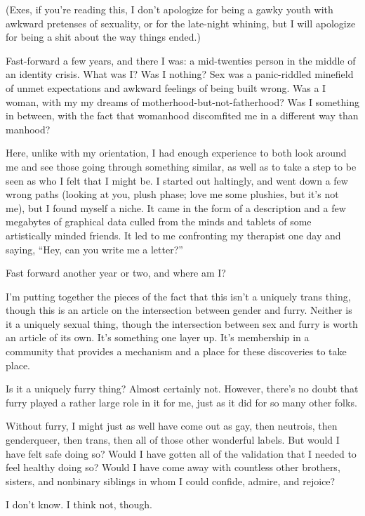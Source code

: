 (Exes, if you're reading this, I don't apologize for being a gawky youth with awkward pretenses of sexuality, or for the late-night whining, but I will apologize for being a shit about the way things ended.)

Fast-forward a few years, and there I was: a mid-twenties person in the middle of an identity crisis.  What was I?  Was I nothing?  Sex was a panic-riddled minefield of unmet expectations and awkward feelings of being built wrong.  Was a I woman, with my my dreams of motherhood-but-not-fatherhood?  Was I something in between, with the fact that womanhood discomfited me in a different way than manhood?

Here, unlike with my orientation, I had enough experience to both look around me and see those going through something similar, as well as to take a step to be seen as who I felt that I might be.  I started out haltingly, and went down a few wrong paths (looking at you, plush phase; love me some plushies, but it's not me), but I found myself a niche.  It came in the form of a description and a few megabytes of graphical data culled from the minds and tablets of some artistically minded friends.  It led to me confronting my therapist one day and saying, ``Hey, can you write me a letter?''

Fast forward another year or two, and where am I?

I'm putting together the pieces of the fact that this isn't a uniquely trans thing, though this is an article on the intersection between gender and furry.  Neither is it a uniquely sexual thing, though the intersection between sex and furry is worth an article of its own.  It's something one layer up.  It's membership in a community that provides a mechanism and a place for these discoveries to take place.

Is it a uniquely furry thing?  Almost certainly not.  However, there's no doubt that furry played a rather large role in it for me, just as it did for so many other folks.

Without furry, I might just as well have come out as gay, then neutrois, then genderqueer, then trans, then all of those other wonderful labels.  But would I have felt safe doing so?  Would I have gotten all of the validation that I needed to feel healthy doing so?  Would I have come away with countless other brothers, sisters, and nonbinary siblings in whom I could confide, admire, and rejoice?

I don't know.  I think not, though.
